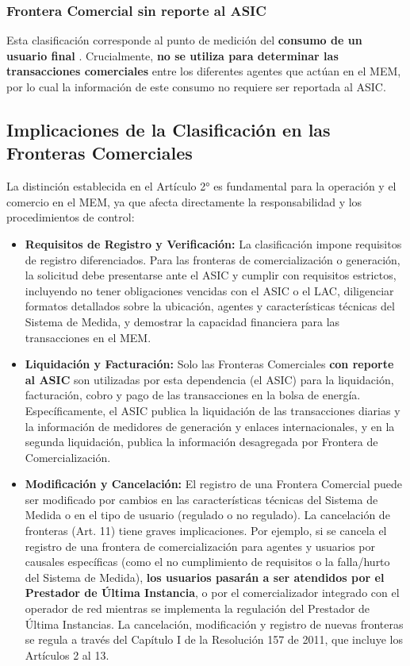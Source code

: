 \documentclass[a5paper]{book}%
\begin{document}
\subsubsection{Frontera Comercial sin reporte al ASIC}

Esta clasificación corresponde al punto de medición del \textbf{consumo de un usuario final} . Crucialmente, \textbf{no se utiliza para determinar las transacciones comerciales} entre los diferentes agentes que actúan en el MEM, por lo cual la información de este consumo no requiere ser reportada al ASIC.

\subsection{Implicaciones de la Clasificación en las Fronteras Comerciales}

La distinción establecida en el Artículo 2° es fundamental para la operación y el comercio en el MEM, ya que afecta directamente la responsabilidad y los procedimientos de control:

\begin{itemize}
	\item \textbf{Requisitos de Registro y Verificación:} La clasificación impone requisitos de registro diferenciados. Para las fronteras de comercialización o generación, la solicitud debe presentarse ante el ASIC y cumplir con requisitos estrictos, incluyendo no tener obligaciones vencidas con el ASIC o el LAC, diligenciar formatos detallados sobre la ubicación, agentes y características técnicas del Sistema de Medida, y demostrar la capacidad financiera para las transacciones en el MEM.
	\item \textbf{Liquidación y Facturación:} Solo las Fronteras Comerciales \textbf{con reporte al ASIC} son utilizadas por esta dependencia (el ASIC) para la liquidación, facturación, cobro y pago de las transacciones en la bolsa de energía. Específicamente, el ASIC publica la liquidación de las transacciones diarias y la información de medidores de generación y enlaces internacionales, y en la segunda liquidación, publica la información desagregada por Frontera de Comercialización.
	\item \textbf{Modificación y Cancelación:} El registro de una Frontera Comercial puede ser modificado por cambios en las características técnicas del Sistema de Medida o en el tipo de usuario (regulado o no regulado). La cancelación de fronteras (Art. 11) tiene graves implicaciones. Por ejemplo, si se cancela el registro de una frontera de comercialización para agentes y usuarios por causales específicas (como el no cumplimiento de requisitos o la falla/hurto del Sistema de Medida), \textbf{los usuarios pasarán a ser atendidos por el Prestador de Última Instancia}, o por el comercializador integrado con el operador de red mientras se implementa la regulación del Prestador de Última Instancias. La cancelación, modificación y registro de nuevas fronteras se regula a través del Capítulo I de la Resolución 157 de 2011, que incluye los Artículos 2 al 13.
\end{itemize}
\end{document}
